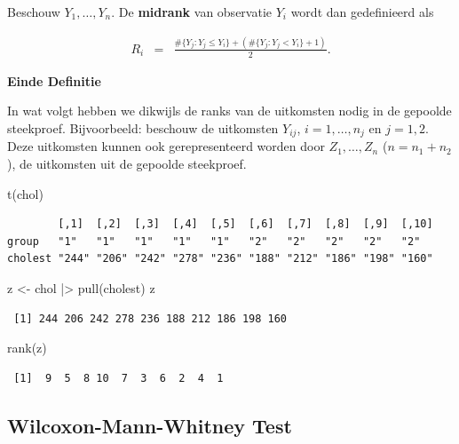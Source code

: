 \documentclass[
  dutch,
  letterpaper,
  12pt]{book}
\newenvironment{Shaded}{\begin{snugshade}}{\end{snugshade}}
\newcommand{\FunctionTok}[1]{\textcolor[rgb]{0.28,0.35,0.67}{#1}}
\newcommand{\NormalTok}[1]{\textcolor[rgb]{0.00,0.23,0.31}{#1}}
\newcommand{\OtherTok}[1]{\textcolor[rgb]{0.00,0.23,0.31}{#1}}
\newcommand{\SpecialCharTok}[1]{\textcolor[rgb]{0.37,0.37,0.37}{#1}}
\theoremstyle{definition}
\theoremstyle{definition}
\theoremstyle{definition}
\theoremstyle{remark}
\begin{document}
Beschouw \(Y_1, \ldots, Y_n\). De \textbf{midrank} van observatie
\(Y_i\) wordt dan gedefinieerd als

\begin{eqnarray*}
  R_i &=& \frac{ \#\{Y_j: Y_j\leq Y_i\} + ( \#\{Y_j: Y_j < Y_i\} +1)}{2}.
\end{eqnarray*}

\textbf{Einde Definitie}

In wat volgt hebben we dikwijls de ranks van de uitkomsten nodig in de
gepoolde steekproef. Bijvoorbeeld: beschouw de uitkomsten \(Y_{ij}\),
\(i=1,\ldots, n_j\) en \(j=1,2\). Deze uitkomsten kunnen ook
gerepresenteerd worden door \(Z_1,\ldots, Z_n\) (\(n=n_1+n_2\)), de
uitkomsten uit de gepoolde steekproef.

\begin{Shaded}
\begin{Highlighting}[]
\FunctionTok{t}\NormalTok{(chol)}
\end{Highlighting}
\end{Shaded}

\begin{verbatim}
        [,1]  [,2]  [,3]  [,4]  [,5]  [,6]  [,7]  [,8]  [,9]  [,10]
group   "1"   "1"   "1"   "1"   "1"   "2"   "2"   "2"   "2"   "2"  
cholest "244" "206" "242" "278" "236" "188" "212" "186" "198" "160"
\end{verbatim}

\begin{Shaded}
\begin{Highlighting}[]
\NormalTok{z }\OtherTok{\textless{}{-}}\NormalTok{ chol }\SpecialCharTok{|\textgreater{}}
  \FunctionTok{pull}\NormalTok{(cholest)}
\NormalTok{z}
\end{Highlighting}
\end{Shaded}

\begin{verbatim}
 [1] 244 206 242 278 236 188 212 186 198 160
\end{verbatim}

\begin{Shaded}
\begin{Highlighting}[]
\FunctionTok{rank}\NormalTok{(z)}
\end{Highlighting}
\end{Shaded}

\begin{verbatim}
 [1]  9  5  8 10  7  3  6  2  4  1
\end{verbatim}

\subsection{Wilcoxon-Mann-Whitney
Test}\label{wilcoxon-mann-whitney-test}
\end{document}
